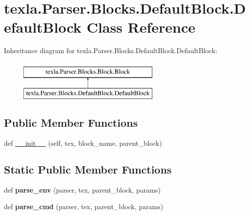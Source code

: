 \hypertarget{classtexla_1_1Parser_1_1Blocks_1_1DefaultBlock_1_1DefaultBlock}{}\section{texla.\+Parser.\+Blocks.\+Default\+Block.\+Default\+Block Class Reference}
\label{classtexla_1_1Parser_1_1Blocks_1_1DefaultBlock_1_1DefaultBlock}
Inheritance diagram for texla.\+Parser.\+Blocks.\+Default\+Block.\+Default\+Block\+:\begin{figure}[H]
\begin{center}
\leavevmode
\includegraphics[height=2.000000cm]{classtexla_1_1Parser_1_1Blocks_1_1DefaultBlock_1_1DefaultBlock}
\end{center}
\end{figure}
\subsection*{Public Member Functions}
\begin{DoxyCompactItemize}
\item 
def \hyperlink{classtexla_1_1Parser_1_1Blocks_1_1DefaultBlock_1_1DefaultBlock_a4425df7cb1f458672c3e733f982f4cd5}{\+\_\+\+\_\+init\+\_\+\+\_\+} (self, tex, block\+\_\+name, parent\+\_\+block)
\end{DoxyCompactItemize}
\subsection*{Static Public Member Functions}
\begin{DoxyCompactItemize}
\item 
\hypertarget{classtexla_1_1Parser_1_1Blocks_1_1DefaultBlock_1_1DefaultBlock_adafd8b34760a28e49bb110fd1ffc110c}{}\label{classtexla_1_1Parser_1_1Blocks_1_1DefaultBlock_1_1DefaultBlock_adafd8b34760a28e49bb110fd1ffc110c} 
def {\bfseries parse\+\_\+env} (parser, tex, parent\+\_\+block, params)
\item 
\hypertarget{classtexla_1_1Parser_1_1Blocks_1_1DefaultBlock_1_1DefaultBlock_a27009494f899a4d6b488ba39a2dd830c}{}\label{classtexla_1_1Parser_1_1Blocks_1_1DefaultBlock_1_1DefaultBlock_a27009494f899a4d6b488ba39a2dd830c} 
def {\bfseries parse\+\_\+cmd} (parser, tex, parent\+\_\+block, params)
\end{DoxyCompactItemize}
